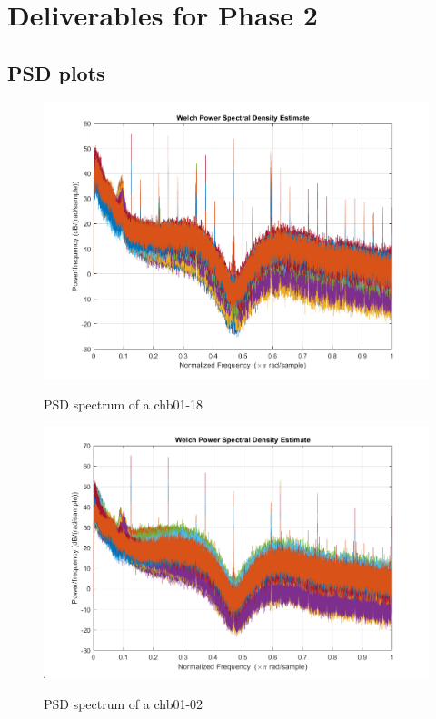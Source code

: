\documentclass[11pt]{article}
\begin{document}
\section{Deliverables for Phase 2}
\subsection{PSD plots}
\begin{figure}[H]
    \begin{center}
        \includegraphics[scale=0.6]{Fig/PSDspect.png}
        \label{fig:PSDspectrum}
        \caption{PSD spectrum of a chb01-18}
    \end{center}
\end{figure}

\begin{figure}[H]
    \begin{center}
        \includegraphics[scale=0.6]{Fig/PSDspect2.png}
        \label{fig:PSDspectrum1}
        \caption{PSD spectrum of a chb01-02}
    \end{center}
\end{figure}
\end{document}
